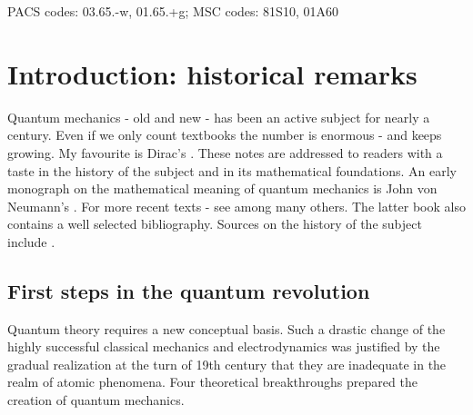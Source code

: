 \bigskip

PACS codes: 03.65.-w, 01.65.+g; MSC codes: 81S10, 01A60

\newpage

\tableofcontents
\bigskip

 
\newpage


\section{Introduction: historical remarks}
\setcounter{equation}{0}
\renewcommand\theequation{\thesection.\arabic{equation}}

\smallskip
Quantum mechanics - old and new - has been an active subject for nearly a century. Even if we only count  textbooks the number is enormous - and keeps growing. My favourite is Dirac's \cite{D30}. These notes are addressed to readers with a taste in the history of the subject and in its mathematical foundations. An early monograph on the mathematical meaning of quantum mechanics is John von Neumann's \cite{vN}. For more recent texts - see \cite{FY, Mac, T} among many others. The latter book also contains a well selected bibliography. Sources on the history of the subject include \cite{MR, Dar, Sch, PJ07}.

\subsection{First steps in the quantum revolution}

Quantum theory requires a new conceptual basis. Such a drastic change of the
highly successful classical mechanics and electrodynamics was justified by the
gradual realization at the turn of 19th century that they are inadequate in the
realm of atomic phenomena. Four theoretical breakthroughs prepared the creation
of quantum mechanics.

